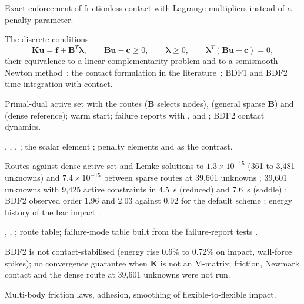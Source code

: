 \begin{description}[style=nextline,leftmargin=1em]
\item[Focus] Exact enforcement of frictionless contact with Lagrange multipliers instead of a penalty parameter.
\item[Mathematics] The discrete conditions
\[
\bm K\bm u=\bm f+\bm B^T\bm\lambda,\qquad \bm B\bm u-\bm c\ge 0,\qquad \bm\lambda\ge 0,\qquad \bm\lambda^T(\bm B\bm u-\bm c)=0,
\]
their equivalence to a linear complementarity problem and to a semismooth Newton method~\cite{hintermuller2002pdas}; the contact formulation in the literature~\cite{wriggers2006contact,wohlmuth2011contact}; BDF1 and BDF2 time integration with contact.
\item[Algorithm] Primal-dual active set with the routes  ($\bm B$ selects nodes),  (general sparse $\bm B$) and  (dense reference); warm start; failure reports with ,  and ; BDF2 contact dynamics.
\item[Implementation] , , , ; the scalar element ; penalty elements  and  as the contrast.
\item[Verification] Routes against dense active-set and Lemke solutions to $1.3\times10^{-15}$ (361 to 3,481 unknowns) and $7.4\times10^{-15}$ between sparse routes at 39,601 unknowns \have{}; 39,601 unknowns with 9,425 active constraints in 4.5~s (reduced) and 7.6~s (saddle) \have{}; BDF2 observed order 1.96 and 2.03 against 0.92 for the default scheme \have{}; energy history of the bar impact \have{}.
\item[Figures and tables] , ,  \have{}; route table; failure-mode table built from the failure-report tests \have{}.
\item[Honest limits] BDF2 is not contact-stabilised (energy rise 0.6\% to 0.72\% on impact, wall-force spikes); no convergence guarantee when $\bm K$ is not an M-matrix; friction, Newmark contact and the dense route at 39,601 unknowns were not run.
\item[Exclusions] Multi-body friction laws, adhesion, smoothing of flexible-to-flexible impact.
\end{description}

